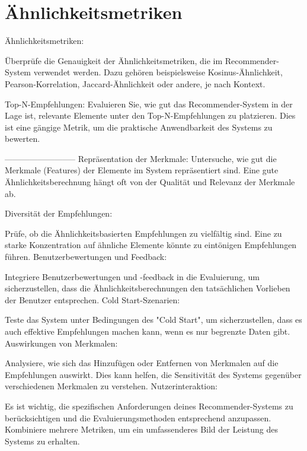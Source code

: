 \chapter{Ähnlichkeitsmetriken}
\label{chap:lösungsansatz}

Ähnlichkeitsmetriken:

Überprüfe die Genauigkeit der Ähnlichkeitsmetriken, die im Recommender-System verwendet werden. Dazu gehören beispielsweise Kosinus-Ähnlichkeit, Pearson-Korrelation, Jaccard-Ähnlichkeit oder andere, je nach Kontext.

Top-N-Empfehlungen:
Evaluieren Sie, wie gut das Recommender-System in der Lage ist, relevante Elemente unter den Top-N-Empfehlungen zu platzieren. Dies ist eine gängige Metrik, um die praktische Anwendbarkeit des Systems zu bewerten.

--------------------------
Repräsentation der Merkmale:
Untersuche, wie gut die Merkmale (Features) der Elemente im System repräsentiert sind. Eine gute Ähnlichkeitsberechnung hängt oft von der Qualität und Relevanz der Merkmale ab.


Diversität der Empfehlungen:

Prüfe, ob die Ähnlichkeitsbasierten Empfehlungen zu vielfältig sind. Eine zu starke Konzentration auf ähnliche Elemente könnte zu eintönigen Empfehlungen führen.
Benutzerbewertungen und Feedback:

Integriere Benutzerbewertungen und -feedback in die Evaluierung, um sicherzustellen, dass die Ähnlichkeitsberechnungen den tatsächlichen Vorlieben der Benutzer entsprechen.
Cold Start-Szenarien:

Teste das System unter Bedingungen des "Cold Start", um sicherzustellen, dass es auch effektive Empfehlungen machen kann, wenn es nur begrenzte Daten gibt.
Auswirkungen von Merkmalen:

Analysiere, wie sich das Hinzufügen oder Entfernen von Merkmalen auf die Empfehlungen auswirkt. Dies kann helfen, die Sensitivität des Systems gegenüber verschiedenen Merkmalen zu verstehen.
Nutzerinteraktion:

Es ist wichtig, die spezifischen Anforderungen deines Recommender-Systems zu berücksichtigen und die Evaluierungsmethoden entsprechend anzupassen. Kombiniere mehrere Metriken, um ein umfassenderes Bild der Leistung des Systems zu erhalten.

